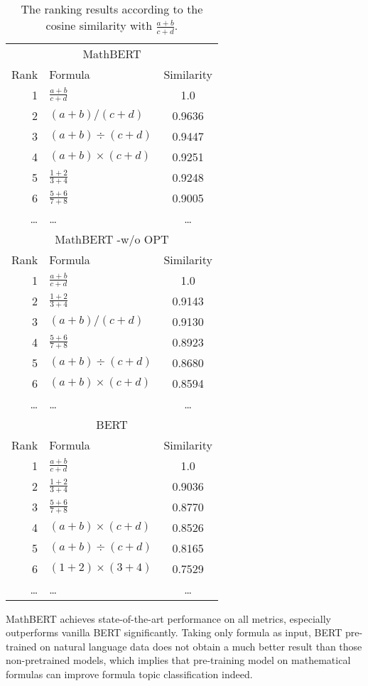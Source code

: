 \documentclass{article}
\begin{document}
\begin{table}[!t]
\centering
\begin{tabular}{rlc}
\toprule
\multicolumn{3}{c}{MathBERT}\\
Rank & Formula  &	Similarity \\
\hline
1 & $\frac{a+b}{c+d}$ &	1.0 \\
2 & $(a+b)/(c+d)$ &	0.9636 \\
3 & $(a+b)\div(c+d)$ & 0.9447 \\
4 & $(a+b)\times(c+d)$ & 0.9251 \\
5 & $\frac{1+2}{3+4}$ & 0.9248 \\
6 & $\frac{5+6}{7+8}$ & 0.9005 \\
… & … & … \\
\hline\hline
\multicolumn{3}{c}{MathBERT -w/o OPT}\\
Rank & Formula  &	Similarity \\
\hline
1 & $\frac{a+b}{c+d}$ &	1.0 \\
2 & $\frac{1+2}{3+4}$ & 0.9143 \\
3 & $(a+b)/(c+d)$ &	0.9130 \\
4 & $\frac{5+6}{7+8}$ & 0.8923 \\
5 & $(a+b)\div(c+d)$ & 0.8680 \\
6 & $(a+b)\times(c+d)$	& 0.8594 \\
… & … & … \\
\hline\hline
\multicolumn{3}{c}{BERT}\\
Rank & Formula  &	Similarity \\
\hline
1 & $\frac{a+b}{c+d}$ &	1.0 \\
2 & $\frac{1+2}{3+4}$ & 0.9036 \\
3 & $\frac{5+6}{7+8}$ & 0.8770 \\
4 & $(a+b)\times(c+d)$ & 0.8526 \\
5 & $(a+b)\div(c+d)$ & 0.8165 \\
6 & $(1+2)\times(3+4)$ & 0.7529 \\
… & … & … \\
\bottomrule
\end{tabular}
\vskip -0.1in
\caption{The ranking results according to the cosine similarity with $\frac{a+b}{c+d}$.}
\label{tab:qualitative}
\vskip -0.15in
\end{table}

MathBERT achieves state-of-the-art performance on all metrics, especially outperforms vanilla BERT significantly. Taking only formula as input, BERT pre-trained on natural language data does not obtain a much better result than those non-pretrained models, which implies that pre-training model on mathematical formulas can improve formula topic classification indeed.
\end{document}
